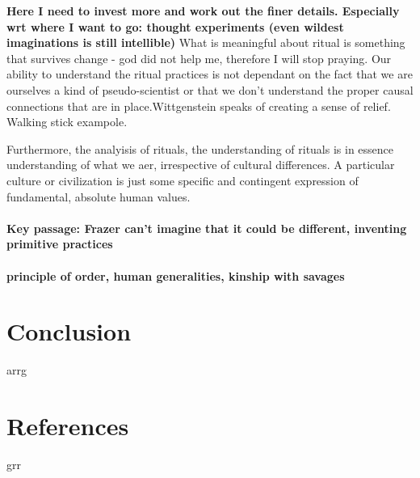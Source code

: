 \documentclass{article}
\begin{document}
\textbf{Here I need to invest more and work out the finer details. Especially wrt where I want to go: thought experiments (even wildest imaginations is still intellible)}
What is meaningful about ritual is something that survives change - god did not help me, therefore I will stop praying. Our ability to understand the ritual practices is not dependant on the fact that we are ourselves a kind of pseudo-scientist or that we don't understand the proper causal connections that are in place.Wittgenstein speaks of creating a sense of relief. Walking stick exampole. 

Furthermore, the analyisis of rituals, the understanding of rituals is in essence understanding of what we aer, irrespective of cultural differences. A particular culture or civilization is just some specific and contingent expression of fundamental, absolute human values.

\paragraph{Key passage: Frazer can't imagine that it could be different, inventing primitive practices}

\paragraph{principle of order, human generalities, kinship with savages}
\paragraph{}



\section{Conclusion}
\hypertarget{sec4}{arrg}
\section{References}
\hypertarget{sec5}{grr}
\end{document}
